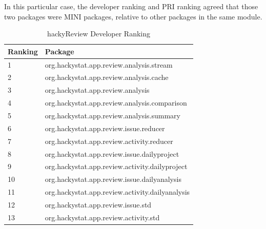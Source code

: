 In this particular case, the developer ranking and PRI ranking agreed that 
those two packages were MINI packages, relative to other packages in the
same module.


\begin{table}[!h]
  \begin{center}
    \caption{hackyReview Developer Ranking}
    \label{tab:hackyReview-developer-ranking}
    \begin{tabular}{|p{1.5cm}|p{11.5cm}|} \hline
{\bf Ranking} & {\bf Package} \\ \hline
1 & org.hackystat.app.review.analysis.stream \\ \hline
2 & org.hackystat.app.review.analysis.cache \\ \hline
3 & org.hackystat.app.review.analysis \\ \hline
4 & org.hackystat.app.review.analysis.comparison \\ \hline
5 & org.hackystat.app.review.analysis.summary \\ \hline
6 & org.hackystat.app.review.issue.reducer \\ \hline
7 & org.hackystat.app.review.activity.reducer \\ \hline
8 & org.hackystat.app.review.issue.dailyproject \\ \hline
9 & org.hackystat.app.review.activity.dailyproject \\ \hline
10 & org.hackystat.app.review.issue.dailyanalysis \\ \hline
11 & org.hackystat.app.review.activity.dailyanalysis \\ \hline
12 & org.hackystat.app.review.issue.std \\ \hline
13 & org.hackystat.app.review.activity.std \\ \hline
    \end{tabular}
  \end{center}
\end{table}


